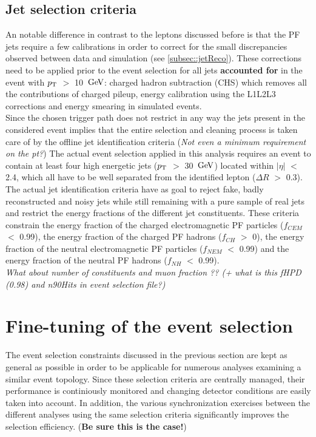 \subsection{Jet selection criteria}
An notable difference in contrast to the leptons discussed before is that the PF jets require a few calibrations in order to correct for the small discrepancies observed between data and simulation (see \ref{subsec::jetReco}). These corrections need to be applied prior to the event selection for all jets \textbf{accounted for} in the event with $p_{\rm T}$ $>$ 10 $\, \mathrm{GeV}$: charged hadron subtraction (CHS) which removes all the contributions of charged pileup, energy calibration using the L1L2L3 corrections and energy smearing in simulated events.
\\

Since the chosen trigger path does not restrict in any way the jets present in the considered event implies that the entire selection and cleaning process is taken care of by the offline jet identification criteria (\textit{Not even a minimum requirement on the pt?})
The actual event selection applied in this analysis requires an event to contain at least four high energetic jets ($p_{\rm T}$ $>$ 30 $\, \mathrm{GeV}$) located within $\vert \eta \vert$ $<$ 2.4, which all have to be well separated from the identified lepton ($\Delta R$ $>$ 0.3).
The actual jet identification criteria have as goal to reject fake, badly reconstructed and noisy jets while still remaining with a pure sample of real jets and restrict the energy fractions of the different jet constituents. These criteria constrain the energy fraction of the charged electromagnetic PF particles ($f_{CEM}$ $<$ 0.99), the energy fraction of the charged PF hadrons ($f_{CH}$ $>$ 0), the energy fraction of the neutral electromagnetic PF particles ($f_{NEM}$ $<$ 0.99) and the energy fraction of the neutral PF hadrons ($f_{NH}$ $<$ 0.99).
\\

\textit{What about number of constituents and muon fraction ?? (+ what is this fHPD (0.98) and n90Hits in event selection file?)}

\section{Fine-tuning of the event selection}\label{sec::SpecificSelec}

The event selection constraints discussed in the previous section are kept as general as possible in order to be applicable for numerous analyses examining a similar event topology.
Since these selection criteria are centrally managed, their performance is continiously monitored and changing detector conditions are easily taken into account.
In addition, the various synchronization exercises between the different analyses using the same selection criteria significantly improves the selection efficiency. (\textbf{Be sure this is the case!})
\\

